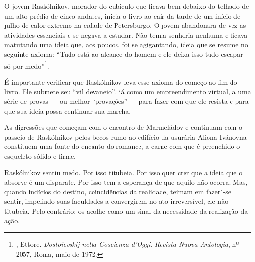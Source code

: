 O jovem Raskólnikov, morador do cubículo que ficava bem debaixo do
telhado de um alto prédio de cinco andares, inicia o livro ao cair da
tarde de um início de julho de calor extremo na cidade de Petersburgo. O
jovem abandonara de vez as atividades essenciais e se negava a estudar.
Não temia senhoria nenhuma e ficava matutando uma ideia que, aos poucos,
foi se agigantando, ideia que se resume no seguinte axioma: ``Tudo está
ao alcance do homem e ele deixa isso tudo escapar só por
medo''\footnote{, Ettore. \emph{Dostoievskij nella Coscienza
  d'Oggi}. \emph{Revista Nuova Antologia}, nº 2057, Roma, maio de 1972.}.

É importante verificar que Raskólnikov leva esse axioma do começo ao fim
do livro. Ele submete seu ``vil devaneio'', já como um empreendimento
virtual, a uma série de provas --- ou melhor ``provações'' --- para fazer
com que ele resista e para que sua ideia possa continuar sua marcha.

As digressões que começam com o encontro de Marmeládov e continuam com o
passeio de Raskólnikov pelos becos rumo ao edifício da usurária Aliona
Ivánovna constituem uma fonte do encanto do romance, a carne com que é
preenchido o esqueleto sólido e firme.

Raskólnikov sentiu medo. Por isso titubeia. Por isso quer crer que a
ideia que o absorve é um disparate. Por isso tem a esperança de que
aquilo não ocorra. Mas, quando indícios do destino, coincidências da
realidade, teimam em fazer"-se sentir, impelindo suas faculdades a
convergirem no ato irreversível, ele não titubeia. Pelo contrário: os
acolhe como um sinal da necessidade da realização da ação.

